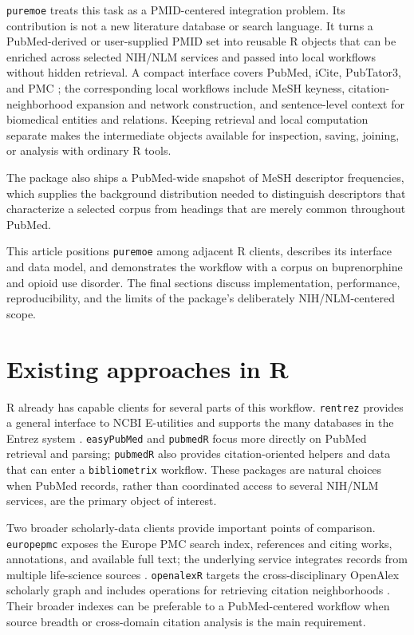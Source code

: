 \texttt{puremoe} \citep{timm2026puremoe} treats this task as a PMID-centered integration
problem. Its contribution is not a new literature database or search language.
It turns a PubMed-derived or user-supplied PMID set into reusable R objects that
can be enriched across selected NIH/NLM services and passed into local workflows
without hidden retrieval. A compact interface covers PubMed, iCite, PubTator3,
and PMC \citep{roberts2001pmc};
the corresponding local workflows include MeSH keyness, citation-neighborhood
expansion and network construction, and sentence-level context for biomedical
entities and relations. Keeping retrieval and local computation separate makes
the intermediate objects available for inspection, saving, joining, or analysis
with ordinary R tools.

The package also ships a PubMed-wide snapshot of MeSH descriptor frequencies,
which supplies the background distribution needed to distinguish descriptors
that characterize a selected corpus from headings that are merely common
throughout PubMed.

This article positions \texttt{puremoe} among adjacent R clients, describes its
interface and data model, and demonstrates the workflow with a corpus on
buprenorphine and opioid use disorder. The final sections discuss
implementation, performance, reproducibility, and
the limits of the package's deliberately NIH/NLM-centered scope.

\section{Existing approaches in R}\label{existing-approaches-in-r}

R already has capable clients for several parts of this workflow. \texttt{rentrez}
provides a general interface to NCBI E-utilities and supports the
many databases in the Entrez system \citep{winter2017rentrez}. \texttt{easyPubMed}
\citep{fantini2025easypubmed} and \texttt{pubmedR} \citep{aria2026pubmedr} focus more directly on
PubMed retrieval and parsing; \texttt{pubmedR} also provides citation-oriented helpers
and data that can enter a \texttt{bibliometrix} workflow. These packages are natural
choices when PubMed records, rather than coordinated access to several NIH/NLM
services, are the primary object of interest.

Two broader scholarly-data clients provide important points of comparison.
\texttt{europepmc} \citep{jahn2023europepmc} exposes the Europe PMC search index, references
and citing works, annotations, and available full text; the underlying service
integrates records from multiple life-science sources \citep{ferguson2021europepmc}.
\texttt{openalexR} targets the cross-disciplinary OpenAlex scholarly graph and includes
operations for retrieving citation neighborhoods \citep{aria2024openalexr}. Their
broader indexes can be preferable to a PubMed-centered workflow when source
breadth or cross-domain citation analysis is the main requirement.

